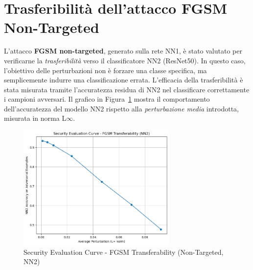     \section{Trasferibilità dell'attacco FGSM Non-Targeted}
        L'attacco \textbf{FGSM non-targeted}, generato sulla rete NN1, è stato valutato per verificarne la \textit{trasferibilità} verso il classificatore NN2 (ResNet50). In questo caso, l’obiettivo delle perturbazioni non è forzare una classe specifica, ma semplicemente indurre una classificazione errata. L’efficacia della trasferibilità è stata misurata tramite l’accuratezza residua di NN2 nel classificare correttamente i campioni avversari.
        Il grafico in Figura~\ref{fig:fgsm_untargeted_transfer} mostra il comportamento dell'accuratezza del modello NN2 rispetto alla \textit{perturbazione media} introdotta, misurata in norma L$\infty$.
        
        \begin{figure}[H]
          \centering
          \includegraphics[width=0.7\textwidth]{images/untargFGSMtrasf.png}
          \caption{Security Evaluation Curve - FGSM Transferability (Non-Targeted, NN2)}
          \label{fig:fgsm_untargeted_transfer}
        \end{figure}

